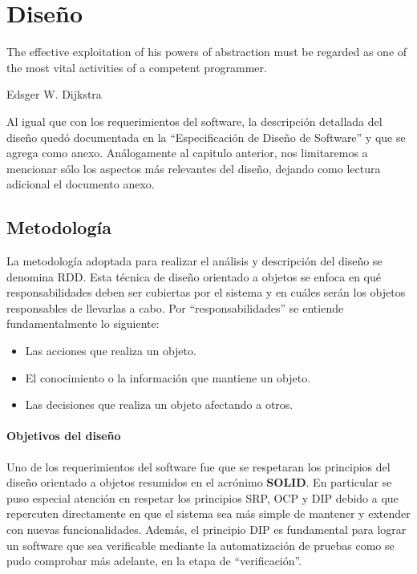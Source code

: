 \chapter{Dise\~no}
\epigraph{The effective exploitation of his powers of abstraction must be
regarded as one of the most vital activities of a competent programmer.}%
{Edsger W. Dijkstra}

Al igual que con los requerimientos del software, la descripci\'on detallada del
dise\~no qued\'o documentada en la ``Especificaci\'on de Dise\~no de Software''
y que se agrega como anexo. An\'alogamente al capitulo anterior, nos limitaremos
a mencionar s\'olo los aspectos m\'as relevantes del dise\~no, dejando como
lectura adicional el documento anexo.

\section{Metodolog\'ia}

La metodolog\'ia adoptada para realizar el an\'alisis y descripci\'on del
dise\~no se denomina \ac{RDD}\cite{Wirfs03}. Esta t\'ecnica de dise\~no
orientado a objetos se enfoca en qu\'e responsabilidades deben ser
cubiertas por el sistema y en cu\'ales ser\'an los objetos responsables de
llevarlas a cabo. Por ``responsabilidades'' se entiende fundamentalmente lo
siguiente:
\begin{itemize}
 \item Las acciones que realiza un objeto.
 \item El conocimiento o la informaci\'on que mantiene un objeto.
 \item Las decisiones que realiza un objeto afectando a otros.
\end{itemize}

\subsubsection{Objetivos del dise\~no}

Uno de los requerimientos del software fue que se respetaran los principios del
dise\~no orientado a objetos resumidos en el acr\'onimo
\textbf{SOLID}\cite{Martin00}. En particular se puso especial atenci\'on en
respetar los principios \ac{SRP}, \ac{OCP} y \ac{DIP} debido a que repercuten
directamente en que el sistema sea m\'as simple de mantener y extender con
nuevas funcionalidades. Adem\'as, el principio \ac{DIP} es fundamental para
lograr un software que sea verificable mediante la automatizaci\'on de pruebas
como se pudo comprobar m\'as adelante, en la etapa de ``verificaci\'on''.

